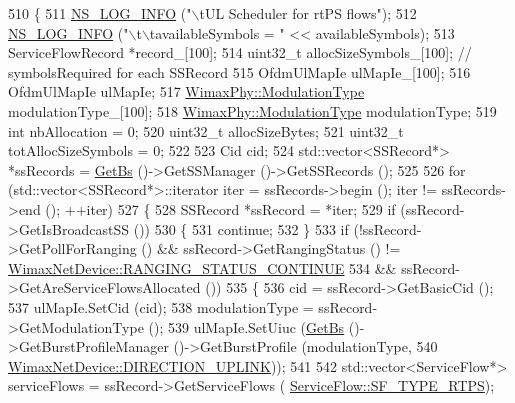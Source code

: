 \begin{DoxyCode}
510 \{
511   \hyperlink{group__logging_gafbd73ee2cf9f26b319f49086d8e860fb}{NS\_LOG\_INFO} (\textcolor{stringliteral}{"\(\backslash\)tUL Scheduler for rtPS flows"});
512   \hyperlink{group__logging_gafbd73ee2cf9f26b319f49086d8e860fb}{NS\_LOG\_INFO} (\textcolor{stringliteral}{"\(\backslash\)t\(\backslash\)tavailableSymbols = "} << availableSymbols);
513   ServiceFlowRecord *record\_[100];
514   uint32\_t allocSizeSymbols\_[100]; \textcolor{comment}{// symbolsRequired for each SSRecord}
515   OfdmUlMapIe ulMapIe\_[100];
516   OfdmUlMapIe ulMapIe;
517   \hyperlink{classns3_1_1WimaxPhy_a044c5d8a48ca992c39c2a946f6e755fa}{WimaxPhy::ModulationType} modulationType\_[100];
518   \hyperlink{classns3_1_1WimaxPhy_a044c5d8a48ca992c39c2a946f6e755fa}{WimaxPhy::ModulationType} modulationType;
519   \textcolor{keywordtype}{int} nbAllocation = 0;
520   uint32\_t allocSizeBytes;
521   uint32\_t totAllocSizeSymbols = 0;
522 
523   Cid cid;
524   std::vector<SSRecord*> *ssRecords = \hyperlink{classns3_1_1UplinkScheduler_afe61b7de71d92d2dff1b135744a6ff7e}{GetBs} ()->GetSSManager ()->GetSSRecords ();
525 
526   \textcolor{keywordflow}{for} (std::vector<SSRecord*>::iterator iter = ssRecords->begin (); iter != ssRecords->end (); ++iter)
527     \{
528       SSRecord *ssRecord = *iter;
529       \textcolor{keywordflow}{if} (ssRecord->GetIsBroadcastSS ())
530         \{
531           \textcolor{keywordflow}{continue};
532         \}
533       \textcolor{keywordflow}{if} (!ssRecord->GetPollForRanging () && ssRecord->GetRangingStatus () != 
      \hyperlink{classns3_1_1WimaxNetDevice_a2a74c0f01e51abc1851a630242e7b591ace0a03105b6d7cf2c6ec79e9789dc3a6}{WimaxNetDevice::RANGING\_STATUS\_CONTINUE}
534           && ssRecord->GetAreServiceFlowsAllocated ())
535         \{
536           cid = ssRecord->GetBasicCid ();
537           ulMapIe.SetCid (cid);
538           modulationType = ssRecord->GetModulationType ();
539           ulMapIe.SetUiuc (\hyperlink{classns3_1_1UplinkScheduler_afe61b7de71d92d2dff1b135744a6ff7e}{GetBs} ()->GetBurstProfileManager ()->GetBurstProfile (modulationType,
540                                                                                  
      \hyperlink{classns3_1_1WimaxNetDevice_a194b6cf7eb59582328eb2531dc9ed884ad37a477621d1df190ff8d8fb933349cd}{WimaxNetDevice::DIRECTION\_UPLINK}));
541 
542           std::vector<ServiceFlow*> serviceFlows = ssRecord->GetServiceFlows (
      \hyperlink{classns3_1_1ServiceFlow_a7990ba10be1e098328fd1e6382a26235a0e98ff713b932a029acad7e5b24bbf55}{ServiceFlow::SF\_TYPE\_RTPS});

\end{DoxyCode}
